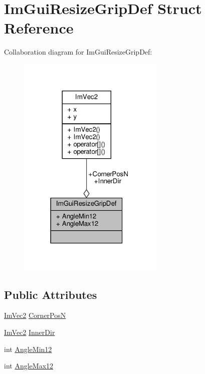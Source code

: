 \hypertarget{structImGuiResizeGripDef}{}\section{Im\+Gui\+Resize\+Grip\+Def Struct Reference}
\label{structImGuiResizeGripDef}


Collaboration diagram for Im\+Gui\+Resize\+Grip\+Def\+:
\nopagebreak
\begin{figure}[H]
\begin{center}
\leavevmode
\includegraphics[width=198pt]{structImGuiResizeGripDef__coll__graph}
\end{center}
\end{figure}
\subsection*{Public Attributes}
\begin{DoxyCompactItemize}
\item 
\hyperlink{structImVec2}{Im\+Vec2} \hyperlink{structImGuiResizeGripDef_ae2f7763b170625f6413e582c971f1792}{Corner\+PosN}
\item 
\hyperlink{structImVec2}{Im\+Vec2} \hyperlink{structImGuiResizeGripDef_a82a1367d835f206fc24b3f114c60f897}{Inner\+Dir}
\item 
int \hyperlink{structImGuiResizeGripDef_a5b335b7be8f517e38c56a5fd8e01d54c}{Angle\+Min12}
\item 
int \hyperlink{structImGuiResizeGripDef_a697cdecca28177e275ce7ec38ef8e802}{Angle\+Max12}
\end{DoxyCompactItemize}


